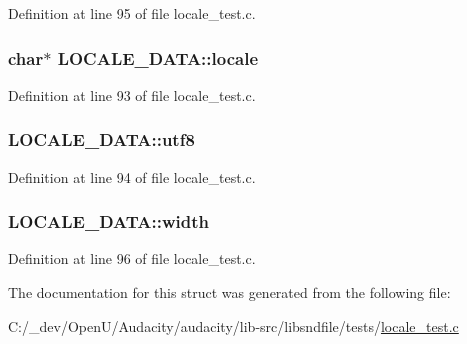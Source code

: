 Definition at line 95 of file locale\+\_\+test.\+c.

\subsubsection[{\texorpdfstring{locale}{locale}}]{ char$\ast$ L\+O\+C\+A\+L\+E\+\_\+\+D\+A\+T\+A\+::locale}\hypertarget{struct_l_o_c_a_l_e___d_a_t_a_a35a1163ee48e9411e16a3ce0641af6c8}{}\label{struct_l_o_c_a_l_e___d_a_t_a_a35a1163ee48e9411e16a3ce0641af6c8}


Definition at line 93 of file locale\+\_\+test.\+c.

\subsubsection[{\texorpdfstring{utf8}{utf8}}]{ L\+O\+C\+A\+L\+E\+\_\+\+D\+A\+T\+A\+::utf8}\hypertarget{struct_l_o_c_a_l_e___d_a_t_a_a39dd2912d4e98c3e1b8df9bcafc5feac}{}\label{struct_l_o_c_a_l_e___d_a_t_a_a39dd2912d4e98c3e1b8df9bcafc5feac}


Definition at line 94 of file locale\+\_\+test.\+c.

\subsubsection[{\texorpdfstring{width}{width}}]{ L\+O\+C\+A\+L\+E\+\_\+\+D\+A\+T\+A\+::width}\hypertarget{struct_l_o_c_a_l_e___d_a_t_a_a725251c86b1d5ae8df49afce9df16f78}{}\label{struct_l_o_c_a_l_e___d_a_t_a_a725251c86b1d5ae8df49afce9df16f78}


Definition at line 96 of file locale\+\_\+test.\+c.



The documentation for this struct was generated from the following file\+:\begin{DoxyCompactItemize}
\item 
C\+:/\+\_\+dev/\+Open\+U/\+Audacity/audacity/lib-\/src/libsndfile/tests/\hyperlink{locale__test_8c}{locale\+\_\+test.\+c}\end{DoxyCompactItemize}
